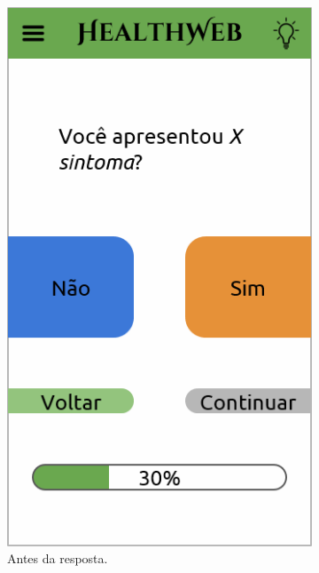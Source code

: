 \begin{figure}[htbp]
	\centering
	\hspace{0.11\linewidth}
	\hfill
	\begin{subfigure}{0.24\linewidth}
		\centering
		\includegraphics[width=\linewidth]{figure/prototype/mobile/symptom.png}
		\caption{Antes da resposta.}
		\label{fig:mobile:symptom}
	\end{subfigure}
	\hfill
	\begin{subfigure}{0.24\linewidth}
		\centering

\end{subfigure}
\end{figure}
